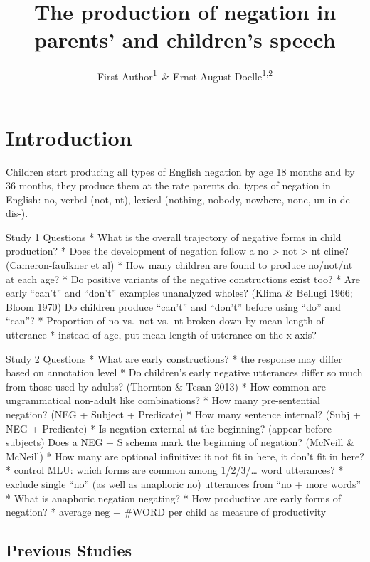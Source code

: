 \documentclass[man,floatsintext,draftall]{apa6}
\title{The production of negation in parents' and children's speech}
\author{First Author\textsuperscript{1}~\& Ernst-August Doelle\textsuperscript{1,2}}
\date{}
\affiliation{
\vspace{0.5cm}
\textsuperscript{1} Wilhelm-Wundt-University\\\textsuperscript{2} Konstanz Business School}
\begin{document}
\maketitle

\hypertarget{introduction}{%
\section{Introduction}\label{introduction}}

Children start producing all types of English negation by age 18 months and by 36 months, they produce them at the rate parents do.
types of negation in English: no, verbal (not, nt), lexical (nothing, nobody, nowhere, none, un-in-de-dis-).

Study 1 Questions
* What is the overall trajectory of negative forms in child production?
* Does the development of negation follow a no \textgreater{} not \textgreater{} nt cline? (Cameron-faulkner et al)
* How many children are found to produce no/not/nt at each age?
* Do positive variants of the negative constructions exist too?
* Are early \enquote{can't} and \enquote{don't} examples unanalyzed wholes? (Klima \& Bellugi 1966; Bloom 1970) Do children produce \enquote{can't} and \enquote{don't} before using \enquote{do} and \enquote{can}?
* Proportion of no vs.~not vs.~nt broken down by mean length of utterance
* instead of age, put mean length of utterance on the x axis?

Study 2 Questions
* What are early constructions?
* the response may differ based on annotation level
* Do children's early negative utterances differ so much from those used by adults? (Thornton \& Tesan 2013)
* How common are ungrammatical non-adult like combinations?
* How many pre-sentential negation? (NEG + Subject + Predicate)
* How many sentence internal? (Subj + NEG + Predicate)
* Is negation external at the beginning? (appear before subjects) Does a NEG + S schema mark the beginning of negation? (McNeill \& McNeill)
* How many are optional infinitive: it not fit in here, it don't fit in here?
* control MLU: which forms are common among 1/2/3/\ldots{} word utterances?
* exclude single \enquote{no} (as well as anaphoric no) utterances from \enquote{no + more words}
* What is anaphoric negation negating?
* How productive are early forms of negation?
* average neg + \#WORD per child as measure of productivity

\hypertarget{previous-studies}{%
\subsection{Previous Studies}\label{previous-studies}}
\end{document}
